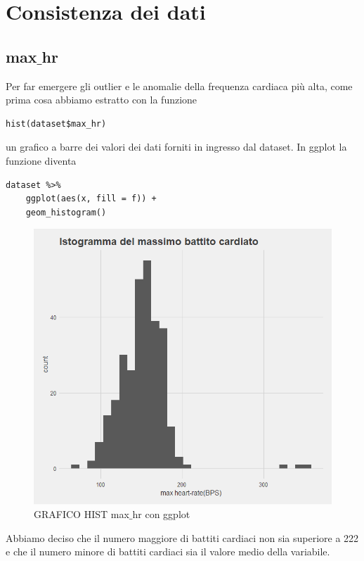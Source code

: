 \documentclass{article}
\begin{document}
\section { Consistenza dei dati }
\subsection{ max$\_$hr }
Per far emergere gli outlier e le anomalie della frequenza cardiaca più alta, come prima cosa abbiamo estratto con la funzione 
\begin{lstlisting}
hist(dataset$max_hr)
 \end{lstlisting}
 un grafico a barre dei valori dei dati forniti in ingresso dal dataset. In ggplot la funzione diventa 
\begin{lstlisting}
dataset %>%
	ggplot(aes(x, fill = f)) + 
	geom_histogram()
 \end{lstlisting}

\begin{figure}[h]
	\centering
	\includegraphics[width=1\textwidth]{max_hr_before.png}
	\caption{GRAFICO HIST max$\_$hr con ggplot}
	\label {fig:ds1}
\end{figure}

Abbiamo deciso che il numero maggiore di battiti cardiaci non sia superiore a 222 e che il numero minore di battiti cardiaci sia il valore medio della variabile. 
\end{document}
